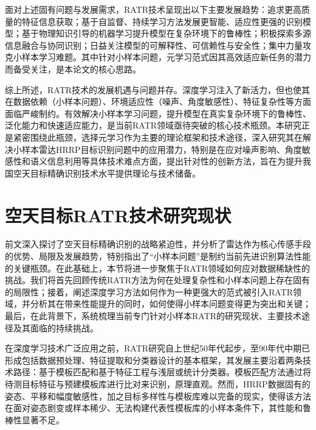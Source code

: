 面对上述固有问题与发展需求，RATR技术呈现出以下主要发展趋势：追求更高质量的特征信息获取；基于自监督、持续学习方法发展更智能、适应性更强的识别模型；基于物理知识引导的机器学习提升模型在复杂环境下的鲁棒性；积极探索多源信息融合与协同识别；日益关注模型的可解释性、可信赖性与安全性；集中力量攻克小样本学习难题。其中针对小样本问题，元学习范式因其高效适应新任务的潜力而备受关注，是本论文的核心思路。

综上所述，RATR技术的发展机遇与问题并存。深度学习注入了新活力，但也使其在数据依赖（小样本问题）、环境适应性（噪声、角度敏感性）、特征复杂性等方面面临严峻制约。有效解决小样本学习问题，提升模型在真实复杂环境下的鲁棒性、泛化能力和快速适应能力，是当前RATR领域亟待突破的核心技术瓶颈。本研究正是紧密围绕此瓶颈，选择元学习作为主要的理论框架和技术途径，深入研究其在解决小样本雷达HRRP目标识别问题中的应用潜力，特别是在应对噪声影响、角度敏感性和语义信息利用等具体技术难点方面，提出针对性的创新方法，旨在为提升我国空天目标精确识别技术水平提供理论与技术储备。


\section{空天目标RATR技术研究现状}
\label{sec:related_work} %
前文深入探讨了空天目标精确识别的战略紧迫性，并分析了雷达作为核心传感手段的优势、局限及发展趋势，特别指出了“小样本问题”是制约当前先进识别算法性能的关键瓶颈。在此基础上，本节将进一步聚焦于RATR领域如何应对数据稀缺性的挑战。我们将首先回顾传统RATR方法为何在处理复杂性和小样本问题上存在固有的局限性；接着，阐述深度学习方法如何作为一种更强大的范式被引入RATR领域，并分析其在带来性能提升的同时，如何使得小样本问题变得更为突出和关键；最后，在此背景下，系统梳理当前专门针对小样本RATR的研究现状、主要技术途径及其面临的持续挑战。

在深度学习技术广泛应用之前，RATR研究自上世纪50年代起步，至90年代中期已形成包括数据预处理、特征提取和分类器设计的基本框架，其发展主要沿着两条技术路径：基于模板匹配和基于特征工程与浅层或统计分类器。模板匹配方法通过将待测目标特征与预建模板库进行比对来识别，原理直观。然而，HRRP数据固有的姿态、平移和幅度敏感性，加之目标多样性与模板库难以完备的现实，使得该方法在面对姿态剧变或样本稀少、无法构建代表性模板库的小样本条件下，其性能和鲁棒性显著不足。

